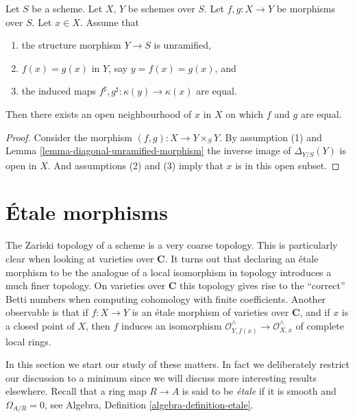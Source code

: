 \begin{lemma}
\label{lemma-value-at-one-point}
Let $S$ be a scheme.
Let $X$, $Y$ be schemes over $S$.
Let $f, g : X \to Y$ be morphisms over $S$. Let $x \in X$.
Assume that
\begin{enumerate}
\item the structure morphism $Y \to S$ is unramified,
\item $f(x) = g(x)$ in $Y$, say $y = f(x) = g(x)$, and
\item the induced maps $f^\sharp, g^\sharp : \kappa(y) \to \kappa(x)$
are equal.
\end{enumerate}
Then there exists an open neighbourhood of $x$ in $X$ on which
$f$ and $g$ are equal.
\end{lemma}

\begin{proof}
Consider the morphism $(f, g) : X \to Y \times_S Y$. By assumption (1) and
Lemma \ref{lemma-diagonal-unramified-morphism}
the inverse image of $\Delta_{Y/S}(Y)$ is open in $X$.
And assumptions (2) and (3) imply that $x$ is in this open subset.
\end{proof}










\section{\'Etale morphisms}
\label{section-etale}

\noindent
The Zariski topology of a scheme is a very coarse topology.
This is particularly clear when looking at varieties over $\mathbf{C}$.
It turns out that declaring an \'etale morphism to be the analogue of a
local isomorphism in topology introduces a much finer topology. On
varieties over $\mathbf{C}$ this topology gives rise to the ``correct'' Betti
numbers when computing cohomology with finite coefficients. Another
observable is that if $f : X \to Y$ is an \'etale morphism of varieties over
$\mathbf{C}$, and if $x$ is a closed point of $X$, then
$f$ induces an isomorphism
$\mathcal{O}^{\wedge}_{Y, f(x)} \to \mathcal{O}^{\wedge}_{X, x}$
of complete local rings.

\medskip\noindent
In this section we start our study of these matters. In fact we deliberately
restrict our discussion to a minimum since we will discuss more interesting
results elsewhere. Recall that a ring map $R \to A$ is said to be {\it \'etale}
if it is smooth and $\Omega_{A/R} = 0$, see
Algebra, Definition \ref{algebra-definition-etale}.

